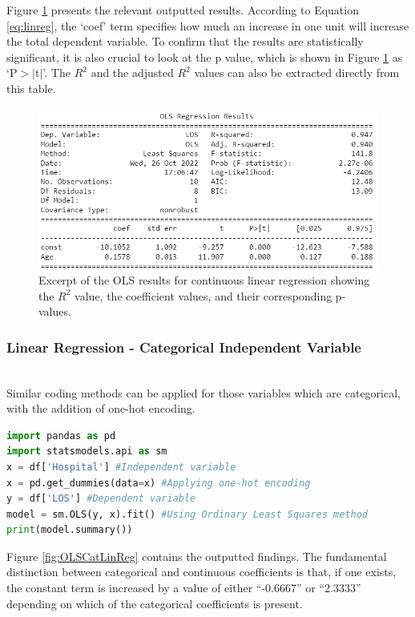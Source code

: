 \documentclass[../thesis.tex]{subfiles}
\begin{document}
Figure \ref{fig:OLSConLinReg} presents the relevant outputted results. According to Equation \eqref{eq:linreg}, the `coef' term specifies how much an increase in one unit will increase the total dependent variable.
To confirm that the results are statistically significant, it is also crucial to look at the p value, which is shown in Figure \ref{fig:OLSConLinReg} as `P$> |$t$|$'. The $R^{2}$ and the adjusted $R^{2}$ values can also be extracted directly from this table.


\begin{figure}[h!]
    \centering
    \includegraphics{Chapters/Chapter3/Figures/OLS Results1.png}
    \caption{Excerpt of the OLS results for continuous linear regression showing the \(R^2\) value, the coefficient values, and their corresponding p-values.}
    \label{fig:OLSConLinReg}
\end{figure}



\subsubsection{Linear Regression - Categorical Independent Variable}\\
Similar coding methods can be applied for those variables which are categorical, with the addition of one-hot encoding.

\begin{lstlisting}[language = python]
import pandas as pd
import statsmodels.api as sm
x = df['Hospital'] #Independent variable
x = pd.get_dummies(data=x) #Applying one-hot encoding
y = df['LOS'] #Dependent variable
model = sm.OLS(y, x).fit() #Using Ordinary Least Squares method
print(model.summary())
\end{lstlisting}

Figure \ref{fig:OLSCatLinReg} contains the outputted findings. The fundamental distinction between categorical and continuous coefficients is that, if one exists, the constant term is increased by a value of either ``-0.6667'' or ``2.3333'' depending on which of the categorical coefficients is present.
\end{document}
